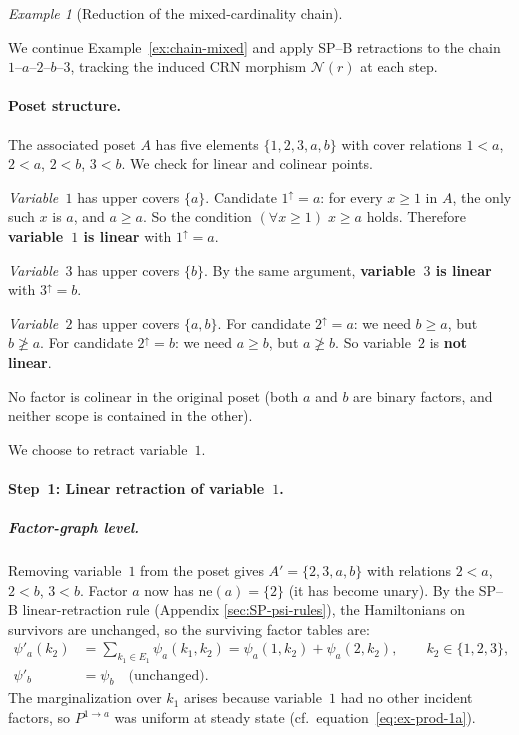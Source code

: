\documentclass{article}
\theoremstyle{plain}
\theoremstyle{definition}
\theoremstyle{remark}
\newtheorem{example}{Example}[section]
\newcommand{\<}{\langle}
\renewcommand{\>}{\rangle}
\begin{document}
\begin{example}[Reduction of the mixed-cardinality chain]\label{ex:chain-mixed-reduction}
 
We continue Example~\ref{ex:chain-mixed} and apply SP--B retractions
to the chain $1$--$a$--$2$--$b$--$3$, tracking the induced CRN
morphism $\mathcal{N}(r)$ at each step.
 
 
\paragraph{Poset structure.}
The associated poset $A$ has five elements
$\{1,2,3,a,b\}$ with cover relations
$1<a$, $2<a$, $2<b$, $3<b$.
We check for linear and colinear points.
 
\smallskip\noindent
\emph{Variable~$1$} has upper covers $\{a\}$.
Candidate $1^{\uparrow}=a$: for every $x\ge 1$ in $A$,
the only such $x$ is $a$, and $a\ge a$.
So the condition $(\forall x\ge 1)\; x\ge a$ holds.
Therefore \textbf{variable~$1$ is linear} with $1^{\uparrow}=a$.
 
\smallskip\noindent
\emph{Variable~$3$} has upper covers $\{b\}$.
By the same argument, \textbf{variable~$3$ is linear} with $3^{\uparrow}=b$.
 
\smallskip\noindent
\emph{Variable~$2$} has upper covers $\{a,b\}$.
For candidate $2^{\uparrow}=a$: we need $b\ge a$, but $b\not\ge a$.
For candidate $2^{\uparrow}=b$: we need $a\ge b$, but $a\not\ge b$.
So variable~$2$ is \textbf{not linear}.
 
\smallskip\noindent
No factor is colinear in the original poset (both $a$ and $b$
are binary factors, and neither scope is contained in the other).
 
We choose to retract variable~$1$.
 
 
\paragraph{Step~1: Linear retraction of variable~$1$.}
 
\subparagraph{Factor-graph level.}
Removing variable~$1$ from the poset gives $A' = \{2,3,a,b\}$ with
relations $2<a$, $2<b$, $3<b$.
Factor $a$ now has $\mathrm{ne}(a)=\{2\}$ (it has become unary).
By the SP--B linear-retraction rule (Appendix \ref{sec:SP-psi-rules}), the Hamiltonians on
survivors are unchanged, so the surviving factor tables are:
\begin{align*}
\psi'_a(k_2)
&= \sum_{k_1\in E_1} \psi_a(k_1, k_2)
 = \psi_a(1,k_2) + \psi_a(2,k_2),
\qquad k_2\in\{1,2,3\},
\\
\psi'_b &= \psi_b \quad\text{(unchanged)}.
\end{align*}
The marginalization over $k_1$ arises because variable~$1$ had no
other incident factors, so $P^{1\to a}$ was uniform at steady state
(cf.\ equation~\eqref{eq:ex-prod-1a}).
 

\end{example}
\end{document}
